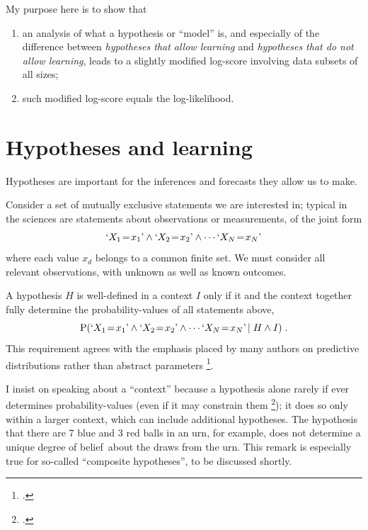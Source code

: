 \documentclass[\ifafour a4paper,12pt,\else a5paper,10pt,\fi%
onecolumn,oneside,article,%
british%
]{memoir}
\theoremstyle{remark}
\theoremstyle{innote}
\newcommand*{\citep}{\footcites}
\newcommand*{\p}{\mathrm{P}}%
\renewcommand*{\|}[1][]{\nonscript\,#1\vert\nonscript\;\mathopen{}}
\newcommand*{\eg}{{e.g.}}
\newcommand*{\prop}[1]{\text{\textquoteleft}#1\text{\textquoteright}}
\newcommand*{\dob}{degree of belief}
\newcommand*{\yK}{I}
\newcommand*{\eq}{\mathrel{\!=\!}}
\begin{document}
My purpose here is to show that
\begin{enumerate}[label=(\alph*)]
\item an analysis of what a hypothesis or \enquote{model} is, and
  especially of the difference between \emph{hypotheses that allow
    learning} and \emph{hypotheses that do not allow learning}, leads
  to a slightly modified log-score involving data subsets of all sizes;
\item such modified log-score equals the log-likelihood.
\end{enumerate}


\section{Hypotheses and learning}
\label{sec:hyp_learn}

Hypotheses are important for the inferences and forecasts they allow us to
make.

Consider a set of mutually exclusive statements we are interested in;
typical in the sciences are statements about observations or
measurements, of the joint form
\begin{equation}
  \label{eq:statements_interested}
  \prop{X_{1}\eq x_{1}} \land
  \prop{X_{2}\eq x_{2}} \land \dotsb
  \prop{X_{N}\eq x_{N}}
\end{equation}
where each value $x_{d}$ belongs to a common finite set. We must consider
all relevant observations, with unknown as well as known outcomes.

A hypothesis $H$ is well-defined in a context $\yK$ only if it and the
context together fully determine the probability-values of all statements
above,
\begin{equation}
  \label{eq:prob_stat_from_hyp}
  \p( \prop{X_{1}\eq x_{1}} \land
  \prop{X_{2}\eq x_{2}} \land \dotsb
  \prop{X_{N}\eq x_{N}} \| H \land \yK) \;.
\end{equation}
This requirement agrees with the emphasis placed by many authors on 
predictive distributions rather than abstract parameters \citep[\eg][]{definetti1930,definetti1937,roberts1965,lauritzen1974,diaconis1988,bernardoetal1994_r2000,fortinietal2000,fortinietal2012}.

I insist on speaking about a \enquote{context} because a hypothesis alone
rarely if ever determines probability-values (even if it may constrain them
\citep{hailperin2011}); it does so only within a larger context, which can
include additional hypotheses. The hypothesis that there are 7 blue and 3
red balls in an urn, for example, does not determine a unique \dob\ about
the draws from the urn. This remark is especially true for so-called
\enquote{composite hypotheses}, to be discussed shortly.
\end{document}
